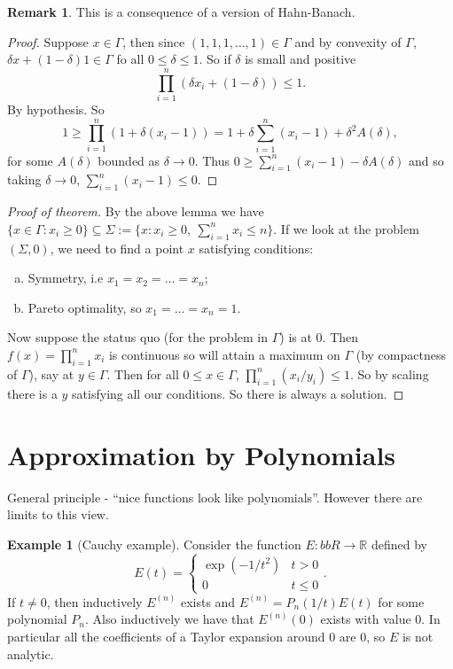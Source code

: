 \documentclass[a4paper, 10pt, twocolumn]{amsart}
\theoremstyle{definition}
\newtheorem*{example}{Example}
\newtheorem*{remark}{Remark}
\newcommand{\bb}[1]{\mathbb{#1}}
\newcommand{\sbs}[0]{\subseteq}
\newcommand{\1}{\mathbbm{1}}
\begin{document}
\begin{remark}
    This is a consequence of a version of Hahn-Banach.
\end{remark}

\begin{proof}
    Suppose $x \in \Gamma$, then since $(1,1,1,\ldots,1) \in \Gamma$ and by convexity of $\Gamma$, $\delta x+ (1-\delta)1 \in \Gamma$ fo all $0\le \delta\le 1$. So if $\delta$ is small and positive\[\prod_{i=1}^n \left(\delta x_i+(1-\delta)\right) \le 1.\]
    By hypothesis. So \[1\ge \prod_{i=1}^n (1+\delta(x_i-1)) = 1+\delta \sum_{i=1}^n (x_i-1) + \delta^2 A(\delta),\]
    for some $A(\delta)$ bounded as $\delta\to 0$. Thus $0\ge \sum_{i=1}^n (x_i-1) - \delta A(\delta)$ and so taking $\delta \to 0$, $\sum_{i=1}^n (x_i-1) \le 0$.  
\end{proof}

\begin{proof}[Proof of theorem]
    By the above lemma we have $\{x \in \Gamma: x_i\ge 0\} \sbs \Sigma := \{x : x_i \ge 0, \ \sum_{i=1}^nx_i \le n\}$. If we look at the problem $(\Sigma,0)$, we need to find a point $x$ satisfying conditions: \begin{enumerate}[(a)]
        \item Symmetry, i.e $x_1=x_2=\ldots=x_n$;
        \item Pareto optimality, so $x_1=\ldots=x_n=1$.
    \end{enumerate}
    Now suppose the status quo (for the problem in $\Gamma$) is at $0$. Then $f(x) = \prod_{i=1}^n x_i$ is continuous so will attain a maximum on $\Gamma$ (by compactness of $\Gamma$), say at $y \in \Gamma$. Then for all $0\le x \in \Gamma$, $\prod_{i=1}^n (x_i/y_i) \le 1$. So by scaling there is a $y$ satisfying all our conditions. So there is always a solution.
\end{proof}

\section{Approximation by Polynomials}

General principle - ``nice functions look like polynomials''. However there are limits to this view.

\begin{example}[Cauchy example]
    Consider the function $E: bb{R} \to \bb{R}$ defined by \[E(t) = \begin{cases} \exp(-1/t^2) & t>0\\ 0 & t\le 0\end{cases}.\]
    If $t\ne 0$, then inductively $E^{(n)}$ exists and $E^{(n)} = P_n(1/t)E(t)$ for some polynomial $P_n$. Also inductively we have that $E^{(n)}(0)$ exists with value $0$. In particular all the coefficients of a Taylor expansion around $0$ are $0$, so $E$ is not analytic. 
\end{example}
\end{document}
